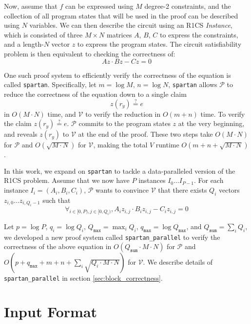 \documentclass{article}
\newcommand{\code}{\texttt}
\newcommand{\Qsum}{Q_{\mathtt{sum}}}
\newcommand{\Qmax}{Q_{\mathtt{max}}}
\newcommand{\qmax}{q_{\mathtt{max}}}
\renewcommand{\P}{\mathcal{P}}
\newcommand{\V}{\mathcal{V}}
\newcommand{\eqq}{\stackrel{?}{=}}
\begin{document}
Now, assume that $f$ can be expressed using $M$ degree-2 constraints, and the collection of all program states that will be used in the proof can be described using $N$ variables. We can then describe the circuit using an R1CS \emph{Instance}, which is consisted of three $M\times N$ matrices $A$, $B$, $C$ to express the constraints, and a length-$N$ vector $z$ to express the program states. The circuit satisfiability problem is then equivalent to checking the correctness of:
$$Az \cdot Bz - Cz = 0$$

One such proof system to efficiently verify the correctness of the equation is called \code{spartan}. Specifically, let $m = \log M$, $n = \log N$, \code{spartan} allows $\P$ to reduce the correctness of the equation down to a single claim
$$z(r_y) \eqq e$$
in $O(M\cdot N)$ time, and $\V$ to verify the reduction in $O(m + n)$ time. To verify the claim $z(r_y) \eqq e$. $\P$ commits to the program states $z$ at the very beginning, and reveals $z(r_y)$ to $\V$ at the end of the proof. These two steps take $O(M\cdot N)$ for $\P$ and $O(\sqrt{M\cdot N})$ for $\V$, making the total $V$ runtime $O(m + n + \sqrt{M\cdot N})$. 

In this work, we expand on \code{spartan} to tackle a data-paralleled version of the R1CS problem. Assume that we now have $P$ instances $I_0\dots I_{P-1}$. For each instance $I_i = (A_i, B_i, C_i)$, $\P$ wants to convince $\V$ that there exists $Q_i$ vectors $z_{i, 0}\dots z_{i, Q_i-1}$ such that
$$\forall_{i\in [0, P), j \in [0, Q_i)}, A_iz_{i, j} \cdot B_iz_{i, j} - C_iz_{i, j} = 0$$

Let $p = \log P$, $q_i = \log Q_i$, $\Qmax = \max_i Q_i$, $\qmax = \log \Qmax$, and $\Qsum = \sum_i Q_i$, we developed a new proof system called \code{spartan\_parallel} to verify the correctness of the above equation in $O(\Qsum \cdot M \cdot N)$ for $\P$ and $O(p + \qmax + m + n + \sum_i \sqrt{Q_i\cdot M\cdot N})$ for $\V$. We describe details of \code{spartan\_parallel} in section \ref{sec:block_correctness}.


\section{Input Format}\label{sec:input}
\end{document}
